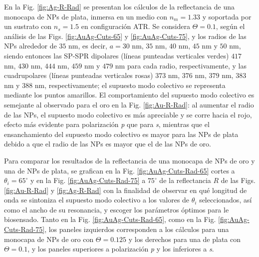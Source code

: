 En la Fig. \ref{fig:Ag-R-Rad}	 se presentan los cálculos de la reflectancia de una monocapa de NPs  de plata, inmersa en un medio con $n_m=1.33$ y soportada por un sustrato con $n_s=1.5$ en configuración ATR. Se considera  $\Theta=0.1$,  según el análisis de las Figs. \ref{fig:AuAg-Cuts-65} y \ref{fig:AuAg-Cuts-75}, y los radios de las NPs alrededor de $35$ nm, es decir, $a=30$ nm, $35$ nm, $40$ nm, $45$ nm y $50$ nm, siendo entonces las SP-SPR dipolares (líneas punteadas verticales verdes) $417$ nm, $430$ nm, $444$ nm, $459$ nm y $479$ nm para cada radio, respectivamente, y las cuadrupolares (líneas punteadas verticales rosas) $373$ nm, $376$ nm, $379$ nm, $383$ nm y $388$ nm, respectivamente; el supuesto modo colectivo se representa mediante los puntos amarillos. El comportamiento del supuesto modo colectivo es semejante al observado para el oro en la Fig. \ref{fig:Au-R-Rad}: al aumentar el radio de las NPs, el supuesto modo colectivo es más apreciable y se corre hacia el rojo, efecto más evidente para polarización \emph{p} que para \emph{s}, mientras que el ensanchamiento del supuesto modo colectivo es mayor para las NPs de plata debido a que el radio de las NPs es mayor que el de las NPs de oro.

Para comparar los resultados de la reflectancia de una monocapa de NPs de oro y una de NPs de  plata, se grafican en la Fig. \ref{fig:AuAg-Cuts-Rad-65} cortes a $\theta_i = 65^\circ$  y en la  Fig.  \ref{fig:AuAg-Cuts-Rad-75} a $75^\circ$ de la reflectancia $R$ de las Figs. \ref{fig:Au-R-Rad} y \ref{fig:Ag-R-Rad} con la finalidad de observar en qué longitud de onda se sintoniza el supuesto modo colectivo a los valores de $\theta_i$ seleccionados, así como el ancho de su resonancia, y escoger los parámetros óptimos para le biosensado. Tanto en la Fig. \ref{fig:AuAg-Cuts-Rad-65}, como en la Fig. \ref{fig:AuAg-Cuts-Rad-75}, los paneles izquierdos corresponden a los cálculos para una monocapa de NPs de oro con $\Theta=0.125$ y los derechos para una de plata con $\Theta=0.1$, y los paneles superiores a polarización \emph{p} y los inferiores a \emph{s}.

